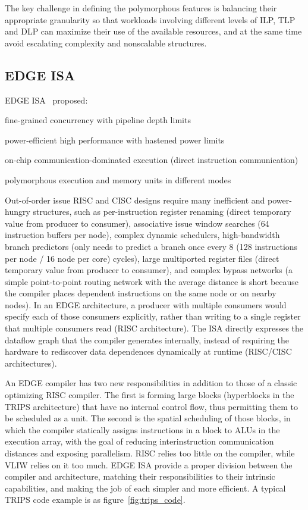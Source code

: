 \documentclass[UTF8,12pt,a4paper]{article}
\begin{document}
The key challenge in defining the polymorphous features
is balancing their appropriate granularity so that
workloads involving different levels of ILP, TLP and DLP
can maximize their use of the available resources,
and at the same time avoid escalating complexity and nonscalable structures.

\subsection{EDGE ISA}

EDGE ISA~\cite{DBLP:journals/computer/BurgerKMDJLMBMY04} proposed:

\begin{compactitem}
  \item fine-grained concurrency with pipeline depth limits
  \item power-efficient high performance with hastened power limits
  \item on-chip communication-dominated execution (direct instruction communication)
  \item polymorphous execution and memory units in different modes
\end{compactitem}

Out-of-order issue RISC and CISC designs require many inefficient and power-hungry structures,
such as per-instruction register renaming (direct temporary value from producer to consumer),
associative issue window searches (64 instruction buffers per node),
complex dynamic schedulers,
high-bandwidth branch predictors (only needs to predict a branch once every 8 (128 instructions per node / 16 node per core) cycles),
large multiported register files (direct temporary value from producer to consumer),
and complex bypass networks (a simple point-to-point routing network with the average distance is short
because the compiler places dependent instructions on the same node or on nearby nodes).
In an EDGE architecture, a producer with multiple consumers would specify each of those consumers explicitly,
rather than writing to a single register that multiple consumers read (RISC architecture).
The ISA directly expresses the dataflow graph that the compiler generates internally,
instead of requiring the hardware to rediscover data dependences dynamically at runtime (RISC/CISC architectures).

An EDGE compiler has two new responsibilities in addition to those of a classic optimizing RISC compiler.
The first is forming large blocks (hyperblocks in the TRIPS architecture) that have no internal control flow,
thus permitting them to be scheduled as a unit.
The second is the spatial scheduling of those blocks,
in which the compiler statically assigns instructions in a block to ALUs in the execution array,
with the goal of reducing interinstruction communication distances and exposing parallelism.
RISC relies too little on the compiler, while VLIW relies on it too much. 
EDGE ISA provide a proper division between the compiler and architecture,
matching their responsibilities to their intrinsic capabilities,
and making the job of each simpler and more efficient.
A typical TRIPS code example is as figure~\ref{fig:trips_code}.
\end{document}
